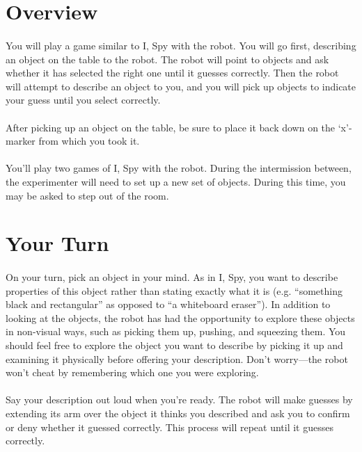 \documentclass{article}
\begin{document}
\section{Overview}

\paragraph{} You will play a game similar to I, Spy with the robot. You will go first, describing an object on the table to the robot. The robot will point to objects and ask whether it has selected the right one until it guesses correctly. Then the robot will attempt to describe an object to you, and you will pick up objects to indicate your guess until you select correctly.

\paragraph{} After picking up an object on the table, be sure to place it back down on the `x'-marker from which you took it.

\paragraph{} You'll play two games of I, Spy with the robot. During the intermission between, the experimenter will need to set up a new set of objects. During this time, you may be asked to step out of the room.

\section{Your Turn}

\paragraph{} On your turn, pick an object in your mind. As in I, Spy, you want to describe properties of this object rather than stating exactly what it is (e.g. ``something black and rectangular'' as opposed to ``a whiteboard eraser''). In addition to looking at the objects, the robot has had the opportunity to explore these objects in non-visual ways, such as picking them up, pushing, and squeezing them. You should feel free to explore the object you want to describe by picking it up and examining it physically before offering your description. Don't worry---the robot won't cheat by remembering which one you were exploring.

\paragraph{} Say your description out loud when you're ready. The robot will make guesses by extending its arm over the object it thinks you described and ask you to confirm or deny whether it guessed correctly. This process will repeat until it guesses correctly.
\end{document}
